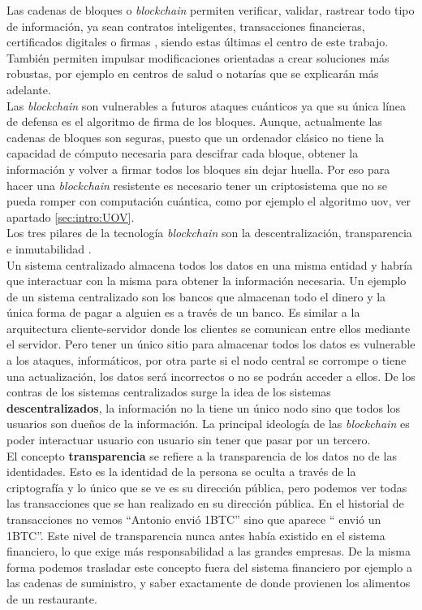 Las cadenas de bloques o \textit{blockchain} permiten verificar, validar, rastrear todo tipo de información, ya sean contratos inteligentes, transacciones financieras, certificados digitales o firmas \cite{blockchain}, siendo estas últimas el centro de este trabajo. También permiten impulsar modificaciones orientadas a crear soluciones más robustas, por ejemplo en centros de salud o notarías que se explicarán más adelante.\\


Las \textit{blockchain} son vulnerables a futuros ataques cuánticos ya que su única línea de defensa es el algoritmo de firma de los bloques. Aunque, actualmente las cadenas de bloques son seguras, puesto que un ordenador clásico no tiene la capacidad de cómputo necesaria para descifrar cada bloque, obtener la información y volver a firmar todos los bloques sin dejar huella. Por eso para hacer una \textit{blockchain} resistente es necesario tener un criptosistema que no se pueda romper con computación cuántica, como por ejemplo el algoritmo \acrshort{uov}, ver apartado \ref{sec:intro:UOV}. \\

Los tres pilares de la tecnología \textit{blockchain} son la descentralización, transparencia e inmutabilidad \cite{pilares-blockchain}.\\

Un sistema centralizado almacena todos los datos en una misma entidad y habría que interactuar con la misma para obtener la información necesaria. Un ejemplo de un sistema centralizado son los bancos que almacenan todo el dinero y la única forma de pagar a alguien es a través de un banco. Es similar a la arquitectura cliente-servidor donde los clientes se comunican entre ellos mediante el servidor. Pero tener un único sitio para almacenar todos los datos es vulnerable a los ataques, informáticos, por otra parte si el nodo central se corrompe o tiene una actualización, los datos será incorrectos o no se podrán acceder a ellos. De los contras de los sistemas centralizados surge la idea de los sistemas \textbf{descentralizados}, la información no la tiene un único nodo sino que todos los usuarios son dueños de la información. La principal ideología de las \textit{blockchain} es poder interactuar usuario con usuario sin tener que pasar por un tercero.\\

El concepto \textbf{transparencia} se refiere a la transparencia de los datos no de las identidades. Esto es la identidad de la persona se oculta a través de la criptografía y lo único que se ve es su dirección pública, pero podemos ver todas las transacciones que se han realizado en su dirección pública. En el historial de transacciones no vemos ``Antonio envió 1BTC'' sino que aparece `` envió un 1BTC''. Este nivel de transparencia nunca antes había existido en el sistema financiero, lo que exige más responsabilidad a las grandes empresas. De la misma forma podemos trasladar este concepto fuera del sistema financiero por ejemplo a las cadenas de suministro, y saber exactamente de donde provienen los alimentos de un restaurante.\\

